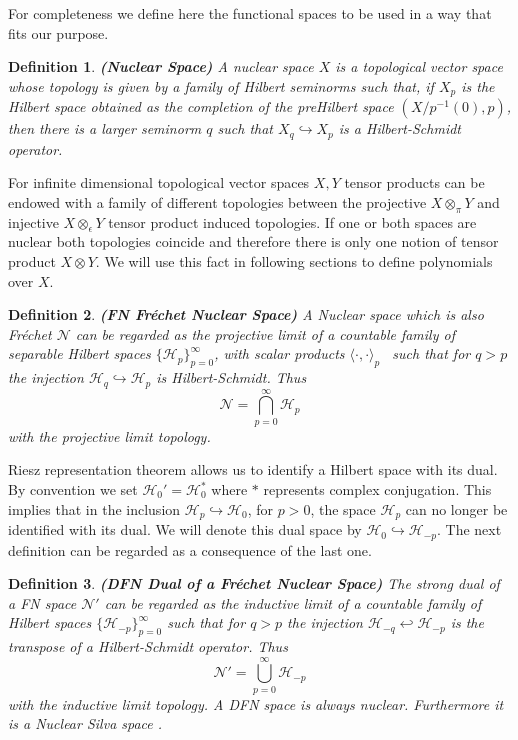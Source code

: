 \documentclass[12pt]{article}%
\newtheorem{definition}{Definition}%
\begin{document}
For completeness we define here the functional spaces to be used in a way that fits our purpose.

\begin{definition}
    \label{def:Nuclear}
    {\bf (Nuclear Space)} A nuclear space $X$ is a  topological vector space whose topology is given by a family of Hilbert seminorms  such that, if $X_{p}$ is the Hilbert space obtained as  the completion of the preHilbert  space $(X/p^{-1}(0), p)$, then there is a larger seminorm $q$ such that $X_q\hookrightarrow X_p$ is a Hilbert-Schmidt operator. 
\end{definition}

For infinite dimensional topological vector spaces $X,Y$ tensor products  can be endowed with a family of  different topologies between the projective $X\otimes_\pi Y$ and injective $X\otimes_\epsilon Y$ tensor product induced topologies.  If one or both spaces are nuclear both topologies coincide and therefore there is only one notion of tensor product $X\otimes Y$. We will  use this fact in following sections to define polynomials over $X$.

\begin{definition}
    \label{def:FN}
    {\bf (FN Fréchet Nuclear Space)} A Nuclear space which is also Fréchet  $\mathcal{N}$  can be regarded as the projective limit of a countable family of separable Hilbert spaces $\{\mathcal{H}_p\}_{p=0}^\infty$, with scalar products $\langle \cdot, \cdot  \rangle_p$ \ such that for $q>p$     
    the injection $\mathcal{H}_q\hookrightarrow \mathcal{H}_p$ is Hilbert-Schmidt. Thus
    $$
    \mathcal{N}=\bigcap_{p=0}^\infty\mathcal{H}_p 
    $$
    with the projective limit topology. 
\end{definition}

 Riesz representation theorem allows us to identify a Hilbert space with its dual. By convention we set $\mathcal{H}_0'=\mathcal{H}_0^*$ where $*$ represents complex conjugation. This implies that in the inclusion $\mathcal{H}_p\hookrightarrow\mathcal{H}_0$, for $p>0$, the space $\mathcal{H}_p$ can no longer be identified with its dual. We will denote this dual space by $\mathcal{H}_0\hookrightarrow\mathcal{H}_{-p}$. The next definition can be regarded as a consequence of the last one. 

\begin{definition}
    \label{def:DFN}
    {\bf (DFN Dual of a Fréchet Nuclear Space)} The strong dual of a FN space  $\mathcal{N}'$  can be regarded as the inductive limit of a countable family of Hilbert spaces $\{\mathcal{H}_{-p}\}_{p=0}^\infty$ such that for $q>p$
    the injection $\mathcal{H}_{-q}\hookleftarrow \mathcal{H}_{-p}$ is the transpose of a  Hilbert-Schmidt operator. Thus
    $$
    \mathcal{N}'=\bigcup_{p=0}^\infty\mathcal{H}_{-p} 
    $$
    with the inductive limit topology. A DFN space is always nuclear. Furthermore it is a Nuclear Silva space \cite{Kriegl1997}.
\end{definition}
\end{document}
